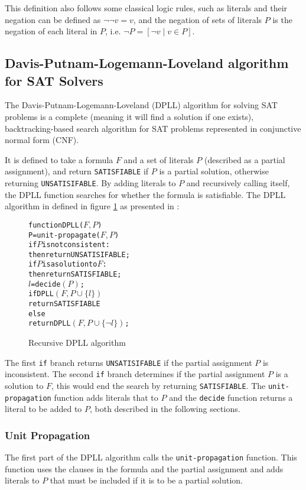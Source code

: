 This definition also follows some classical logic rules, such as literals and their negation can be defined as $\neg \neg v = v$,
and the negation of sets of literals $P$ is the negation of each literal in $P$, i.e. $\neg P = [\neg v \mid v \in P]$.

\subsection{Davis-Putnam-Logemann-Loveland algorithm for SAT Solvers}
The Davis-Putnam-Logemann-Loveland (DPLL) algorithm \citep{Davis1960, davis1962machine} for solving SAT problems is a complete (meaning it will find a solution if one exists), 
backtracking-based search algorithm for SAT problems represented in conjunctive normal form (CNF).

It is defined to take a formula $F$ and a set of literals $P$ (described as a partial assignment), and return \verb+SATISFIABLE+ if $P$ is a partial solution, 
otherwise returning \verb+UNSATISIFABLE+.
By adding literals to $P$ and recursively  calling itself, the DPLL function searches for whether the formula is satisfiable.
The DPLL algorithm in defined in figure \ref{impl.DPLL} as presented in \citep{dixon2004automating}:
\begin{figure}[h]
\begin{center}
\begin{alltt}
function DPLL(\(F, P\))
   P = unit-propagate(\(F, P\))
   if \(P\) is not consistent:
       then return UNSATISIFABLE;
   if \(P\) is a solution to \(F\):
       then return SATISFIABLE;
   \(l\) = decide\((P)\);
   if DPLL\((F, P \cup \{l\})\)
       return SATISFIABLE
   else
       return DPLL\((F, P \cup \{\neg l\})\);
\end{alltt}
  \caption{Recursive DPLL algorithm}
  \label{impl.DPLL}
\end{center}
\end{figure}

The first \verb+if+ branch returns \verb+UNSATISIFABLE+ if the partial assignment $P$ is inconsistent.
The second \verb+if+ branch determines if the partial assignment $P$ is a solution to $F$, this would end the search by returning \verb+SATISFIABLE+.
The \verb+unit-propagation+ function adds literals that to $P$ and the \verb+decide+ function returns a literal to be added to $P$, both described in the following sections. 

\subsubsection{Unit Propagation}
The first part of the DPLL algorithm calls the \verb+unit-propagation+ function.
This function uses the clauses in the formula and the partial assignment and adds literals to $P$ that must be included if it is to be a partial solution.

